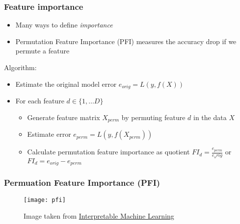 \begin{frame}
  \frametitle{Feature importance}
  \begin{itemize}
    \item Many ways to define \emph{importance}
    \item Permutation Feature Importance (PFI) measures the accuracy drop if we permute a feature
  \end{itemize}

  \noindent\makebox[\linewidth]{\rule{\paperwidth}{0.4pt}}

  Algorithm:
  \begin{itemize}
    \item Estimate the original model error $e_{orig} = L(y,f(X))$
    \item For each feature $ d \in \{1, \ldots D\}$
    \begin{itemize}
      \item Generate feature matrix $X_{perm}$ by permuting feature $d$ in the data $X$
      \item Estimate error $e_{perm} = L(y,f(X_{perm}))$
      \item Calculate permutation feature importance as quotient $FI_d = \frac{e_{perm}}{e_orig}$ or $FI_d = e_{orig} - e_{perm}$
    \end{itemize}
  \end{itemize}

\end{frame}


\begin{frame}
  \frametitle{Permuation Feature Importance (PFI)}
  \begin{figure}
    \centering
    \texttt{[image: pfi]}
    \caption{Image taken from \href{https://christophm.github.io/interpretable-ml-book/feature-importance.html}{Interpretable Machine Learning}}
  \end{figure}
\end{frame}


